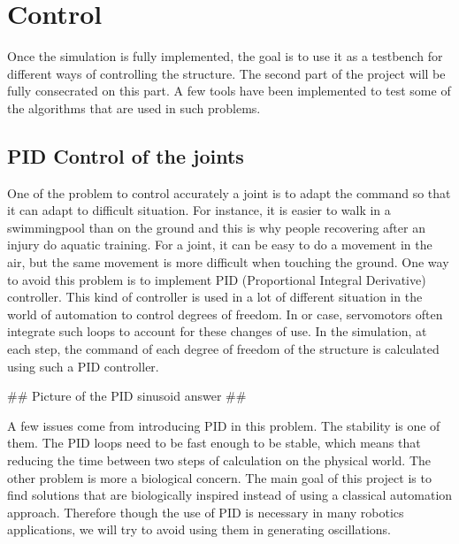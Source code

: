 
\chapter{Control} %

\label{Chapter 2} %


%
Once the simulation is fully implemented, the goal is to use it as a testbench for different ways of controlling the structure. The second part of the project will be fully consecrated on this part. A few tools have been implemented to test some of the algorithms that are used in such problems. 

\section{PID Control of the joints}

One of the problem to control accurately a joint is to adapt the command so that it can adapt to difficult situation. For instance, it is easier to walk in a swimmingpool than on the ground and this is why people recovering after an injury do aquatic training. For a joint, it can be easy to do a movement in the air, but the same movement is more difficult when touching the ground. One way to avoid this problem is to implement PID (Proportional Integral Derivative) controller. This kind of controller is used in a lot of different situation in the world of automation to control degrees of freedom. In or case, servomotors often integrate such loops to account for these changes of use. In the simulation, at each step, the command of each degree of freedom of the structure is calculated using such a PID controller. 


## Picture of the PID sinusoid answer ##

A few issues come from introducing PID in this problem. The stability is one of them. The PID loops need to be fast enough to be stable, which means that reducing the time between two steps of calculation on the physical world. The other problem is more a biological concern. The main goal of this project is to find solutions that are biologically inspired instead of using a classical automation approach. Therefore though the use of PID is necessary in many robotics applications, we will try to avoid using them in generating oscillations. 

